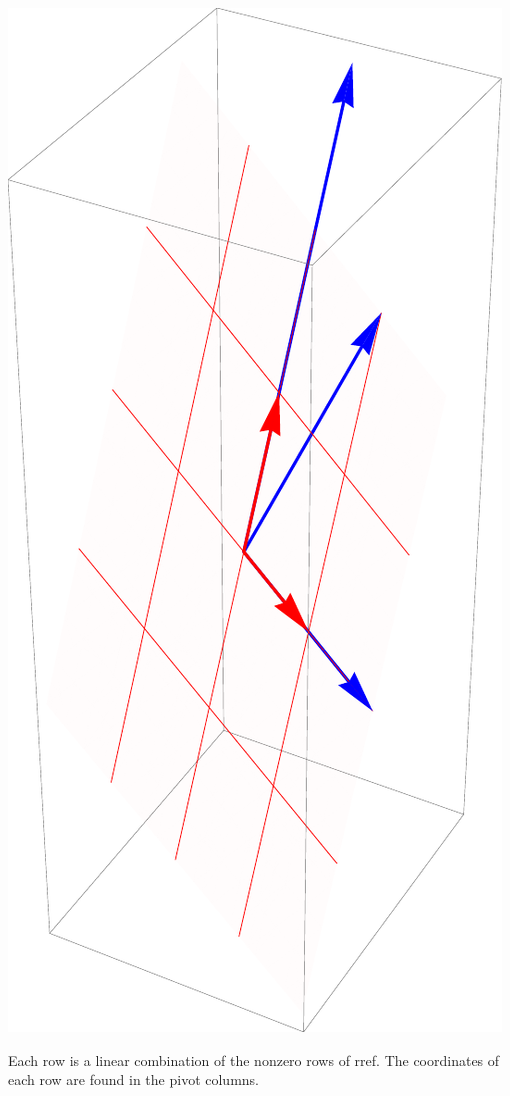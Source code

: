 \begin{example}
{\includegraphics[width=\marginparwidth]{Applications/support/rowspace2}

Each row is a linear combination of the nonzero rows of rref.  The coordinates of each row are found in the pivot columns.
}\end{example}

